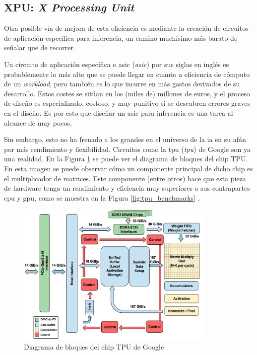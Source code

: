 \subsection{XPU: \textit{X Processing Unit}}
\label{ssec:xpu}
Otra posible vía de mejora de esta eficiencia es mediante la creación de circuitos de aplicación específica para inferencia, un camino muchísimo más barato de señalar que de recorrer.

Un circuito de aplicación específica o \acrshort{asic} (\textit{\acrlong{asic}}) por sus siglas en inglés es probablemente lo más alto que se puede llegar en cuanto a eficiencia de cómputo de un \textit{workload}, pero también es lo que incurre en más gastos derivados de su desarrollo. Estos costes se sitúan en los (miles de) millones de euros, y el proceso de diseño es especializado, costoso, y muy punitivo si se descubren errores graves en el diseño. Es por esto que diseñar un \acrshort{asic} para inferencia es una tarea al alcance de muy pocos.


Sin embargo, esto no ha frenado a los grandes en el universo de la \acrshort{ia} en su afán por más rendimiento y flexibilidad. Circuitos como la \acrshort{tpu} (\textit{\acrlong{tpu}}) de Google son ya una realidad. En la Figura \ref{fig:tpu_block_diagram} \cite{jouppi2017_in_datacenter_tpu} se puede ver el diagrama de bloques del chip TPU. En esta imagen se puede observar cómo un componente principal de dicho chip es el multiplicador de matrices. Este componente (entre otros) hace que esta pieza de hardware tenga un rendimiento y eficiencia muy superiores a sus contrapartes \acrshort{cpu} y \acrshort{gpu}, como se muestra en la Figura \ref{fig:tpu_benchmarks} \cite{devopedia_tpu}.

\begin{figure}[h!]
    \centering
    \includegraphics[width=0.85\textwidth]{img/tpu_block_diagram.jpg}
    \caption{Diagrama de bloques del chip TPU de Google}
    \label{fig:tpu_block_diagram}
\end{figure}

